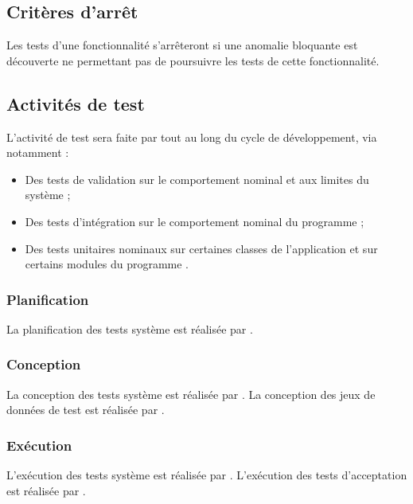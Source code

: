 \subsection{Critères d'arrêt}
\label{sec:process:arret}

Les tests d'une fonctionnalité s'arrêteront si une anomalie bloquante est découverte ne permettant pas de poursuivre les tests de cette fonctionnalité.

\subsection{Activités de test}
\label{sec:process:activites}  
  
L'activité de test sera faite par {\equipe} tout au long du cycle de développement, via notamment :
\begin{itemize}
    \item Des tests de validation sur le comportement nominal et aux limites du système ;
    \item Des tests d'intégration sur le comportement nominal du programme {\appliC} ;
    \item Des tests unitaires nominaux sur certaines classes de l'application {\appliA} et sur certains modules du programme {\appliC}.
\end{itemize}

\subsubsection{Planification}

La planification des tests système est réalisée par {\equipe}.

\subsubsection{Conception}

La conception des tests système est réalisée par {\equipe}.
La conception des jeux de données de test est réalisée par {\equipe}.

\subsubsection{Exécution}

L'exécution des tests système est réalisée par {\equipe}.
L'exécution des tests d'acceptation est réalisée par {\client}.

